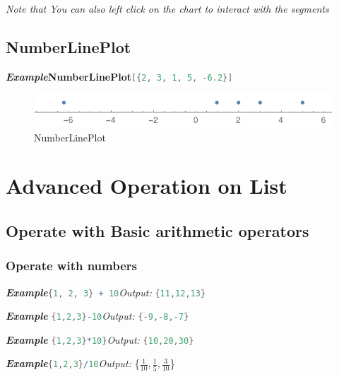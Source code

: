 \documentclass[10pt]{book}
\begin{document}
\noindent\emph{Note that You can also left click on the chart to interact with the segments}

\subsection{NumberLinePlot}
\label{subsec:label}

\emph{\textbf{Example}}\quad\textbf{NumberLinePlot}\lstinline[language=Mathematica]|[{2, 3, 1, 5, -6.2}]|

\begin{figure}[H]
  \centering
  \includegraphics[width=0.45\linewidth]{figures/NumberLinePlot}
  \caption{NumberLinePlot}
\end{figure}






\section{Advanced Operation on List}
\label{sec:label}

\subsection{Operate with Basic arithmetic operators}
\label{subsec:label}

\subsubsection{Operate with numbers}
\noindent\emph{\textbf{Example}}\quad\lstinline[language=Mathematica]|{1, 2, 3} + 10|\hspace{\fill}\emph{Output:} \lstinline[language=Mathematica]|{11,12,13}|

\noindent\emph{\textbf{Example}}\quad
\lstinline[language=Mathematica]|{1,2,3}-10|\hspace{\fill}\emph{Output:} \lstinline[language=Mathematica]|{-9,-8,-7}|


\noindent\emph{\textbf{Example}}\quad
\lstinline[language=Mathematica]|{1,2,3}*10}|\hspace{\fill}\emph{Output:} \lstinline[language=Mathematica]|{10,20,30}|

\noindent\emph{\textbf{Example}}\quad\lstinline[language=Mathematica]|{1,2,3}/10|\hspace{\fill}\emph{Output:} \{$\frac{1}{10},\frac{1}{5},\frac{3}{10}$\}
\end{document}
